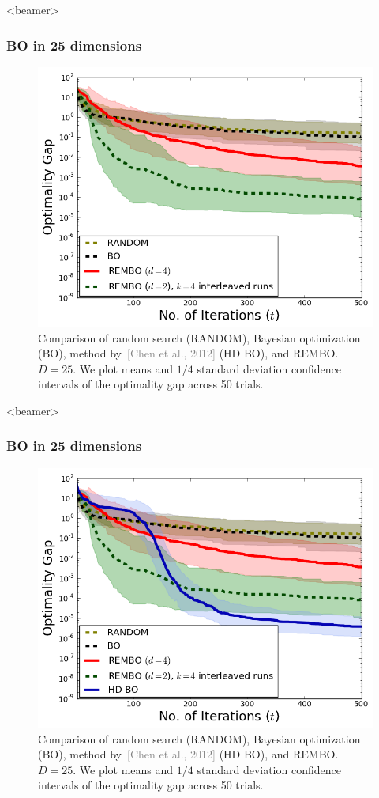 \documentclass[grey]{beamer}
\begin{document}
 
 \begin{frame}<beamer>
 \frametitle{BO in 25 dimensions}
 \begin{figure}
   \includegraphics[width=0.6\columnwidth]{./figs/branin_dis4.png}
    \caption{Comparison of random search (RANDOM), Bayesian optimization (BO),
     method by~\textcolor{gray}{[Chen et al., 2012]} (HD BO), and REMBO.
     $D=25$. We plot means and $1/4$ 
     standard deviation confidence intervals of the optimality gap across 50 trials.}
   \label{fig:standard}
  \end{figure}
 \end{frame}
 
 \begin{frame}<beamer>
 \frametitle{BO in 25 dimensions}
 \begin{figure}
   \includegraphics[width=0.6\columnwidth]{./figs/branin_dis5.png}
    \caption{Comparison of random search (RANDOM), Bayesian optimization (BO),
     method by~\textcolor{gray}{[Chen et al., 2012]} (HD BO), and REMBO.
     $D=25$. We plot means and $1/4$ 
     standard deviation confidence intervals of the optimality gap across 50 trials.}
   \label{fig:standard}
  \end{figure}
 \end{frame}
 
 
\end{document}
